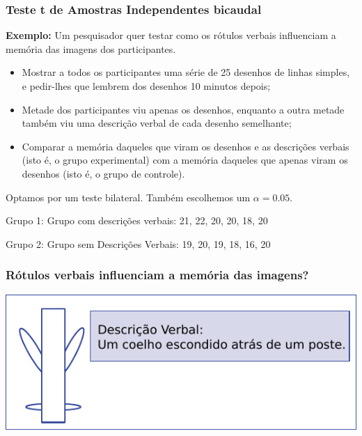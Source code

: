 \documentclass[11pt]{beamer}
\begin{document}
\begin{frame}
\frametitle{Teste t de Amostras Independentes bicaudal}

\textbf{Exemplo:} Um pesquisador quer testar como os rótulos verbais influenciam a memória das imagens dos participantes. 
 
\begin{itemize}
\item Mostrar a todos os participantes uma série de 25 desenhos de linhas simples, e pedir-lhes que lembrem dos desenhos 10 minutos depois;
\item Metade dos participantes viu apenas os desenhos, enquanto a outra metade também viu uma descrição verbal de cada desenho semelhante;
\item Comparar a memória daqueles que viram os desenhos e as descrições verbais (isto é, o grupo experimental) com a memória daqueles que apenas viram os desenhos (isto é, o grupo de controle).
\end{itemize}

Optamos por um teste bilateral. Também escolhemos um \(\alpha=0.05\).

Grupo 1: Grupo com descrições verbais:
21, 22, 20, 20, 18, 20

Grupo 2: Grupo sem Descrições Verbais:
19, 20, 19, 18, 16, 20

\end{frame}

\begin{frame}
\frametitle{Rótulos verbais influenciam a memória das imagens?}

\begin{center}\includegraphics[width=0.9\linewidth]{figs/fig10.1} \end{center}

\end{frame}
\end{document}

